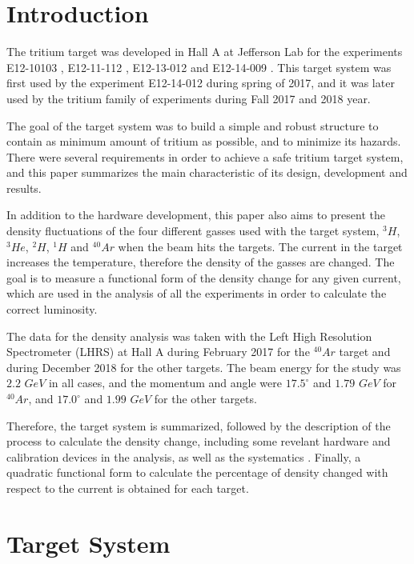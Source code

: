 \documentclass[final,5p,times,twocolumn]{elsarticle}
\begin{document}

\section{Introduction}
\label{}

The tritium target was developed in Hall A at Jefferson Lab for the experiments E12-10103 \cite{marathon}, E12-11-112 \cite{E12-11-112}, 
E12-13-012 \cite{E12-13-012} and E12-14-009 \cite{E12-14-009}. This target system was first used by the experiment E12-14-012 \cite{E12-14-012} 
during spring of 2017, and it was later used by the tritium family of experiments during  Fall 2017 and  2018 year. 

The goal of the target system was to build a simple and robust structure to contain as minimum amount of tritium as possible, and to minimize 
its hazards. There were several requirements in order to achieve a safe tritium target system, and this paper summarizes the main characteristic 
of its design, development and results. 

In addition to the hardware development, this paper also aims to present the density fluctuations of the four different gasses used 
with the target system, $^{3}H$, $^{3}He$, $^{2}H$, $^{1}H$ and $^{40}Ar$ when the beam hits the targets. The current in the target 
increases the temperature, therefore the density of the gasses are changed. The goal is to measure a functional form of the density 
change for any given current, which are used in the analysis of all the experiments in order to calculate the correct luminosity.

The data for the density analysis was taken with the Left High Resolution Spectrometer (LHRS) at Hall A during February 2017 
for the $^{40}Ar$ target and during December 2018 for the other targets. The beam energy for the study was $2.2$ $GeV$ in all 
cases, and the momentum and angle were $17.5 ^\circ $ and $1.79$ $GeV$ for $^{40}Ar$, and $17.0 ^\circ $ and $1.99$ $GeV$ for 
the other targets.

Therefore, the target system is summarized, followed by the description of the process to calculate the density change, including 
some revelant hardware and calibration devices in the analysis, as well as the systematics . Finally, a quadratic functional form 
to calculate the percentage of density changed with respect to the current is  obtained for each target.


\section{Target System}
\end{document}
